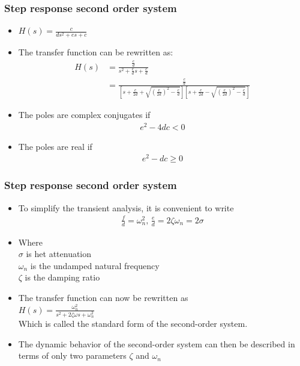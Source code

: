 \begin{frame}
\frametitle{Step response second order system}
\begin{itemize}
\item $H(s) = \frac{c}{ds^2+es+c}$
\vspace{0.45cm}
\item The transfer function can be rewritten as:
\\ 
\begin{align*}
H(s) &= \frac{\frac{c}{d}}{s^2+\frac{e}{d}s+\frac{c}{d}}
\\ &= \frac{\frac{c}{d}}{[s+\frac{e}{2d}+\sqrt{(\frac{e}{2d})^2-\frac{c}{d}}][s+\frac{e}{2d}-\sqrt{(\frac{e}{2d})^2-\frac{c}{d}}]}
\end{align*}
\item The poles are complex conjugates if
\\ \vspace{-0.15cm}
\begin{align*}
e^2 -4dc <0
\end{align*}
\item The poles are real if
\\
\begin{align*}
e^2 -dc\ge 0
\end{align*}
\end{itemize}
\end{frame}

\begin{frame}
\frametitle{Step response second order system}
\begin{itemize}
\item To simplify the transient analysis, it is convenient to write
\\ 
\begin{align*}
\frac{f}{d} = \omega_n ^2\text{, } \frac{e}{d}=2\zeta\omega_n=2\sigma
\end{align*}
\item Where 
\\ $\sigma$ is het attenuation 
\\$\omega_n$ is the undamped natural frequency 
\\ $\zeta$ is the damping ratio
\vspace{0.25cm}
\item The transfer function can now be rewritten as
\\ $H(s) = \frac{\omega_n ^2}{s^2+2\zeta\omega s +\omega_n ^2}$
\\ Which is called the standard form of the second-order system.
\vspace{0.25cm}
\item The dynamic behavior of the second-order system can then be described in terms of only two parameters $\zeta$ and $\omega_n$
\end{itemize} 
\end{frame}

